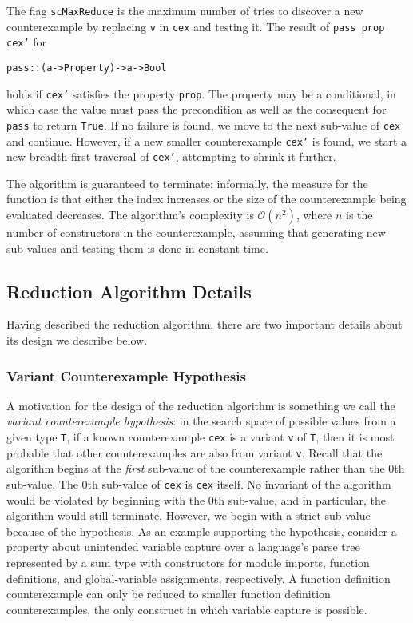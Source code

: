 \documentclass{sigplanconf}
\newenvironment{code}{\begin{alltt}}{\end{alltt}}
\newcommand{\ttp}[1]{\texttt{#1}}
\begin{document}
The flag \ttp{scMaxReduce} is the maximum number of tries to discover a new
counterexample by replacing \ttp{v} in \ttp{cex} and testing it.  The result of
\ttp{pass prop cex'} for
%
\begin{code}
pass :: (a -> Property) -> a -> Bool
\end{code}
%
\noindent
holds if \ttp{cex'} satisfies the property \ttp{prop}.  The property may be a
conditional, in which case the value must pass the precondition as well as the
consequent for \ttp{pass} to return \ttp{True}.  If no failure is found, we move
to the next sub-value of \ttp{cex} and continue.  However, if a new smaller
counterexample \ttp{cex'} is found, we start a new breadth-first traversal of
\ttp{cex'}, attempting to shrink it further.

The algorithm is guaranteed to terminate: informally, the measure for the
function is that either the index increases or the size of the counterexample
being evaluated decreases.  The algorithm's complexity is
$\mathcal{O}(n^2)$, where $n$ is the number of constructors in the
counterexample, assuming that generating new sub-values and testing them is done
in constant time.

\subsection{Reduction Algorithm Details}\label{sec:details}
Having described the reduction algorithm, there are two important details about
its design we describe below.

\subsubsection{Variant Counterexample Hypothesis}
A motivation for the design of the reduction algorithm is something we call the
\emph{variant counterexample hypothesis}: in the search space of possible values
from a given type \ttp{T}, if a known counterexample \ttp{cex} is a variant
\ttp{v} of \ttp{T}, then it is most probable that other counterexamples are also
from variant \ttp{v}.  Recall that the algorithm begins at the \emph{first}
sub-value of the counterexample rather than the 0th sub-value.  The 0th
sub-value of \ttp{cex} is \ttp{cex} itself.  No invariant of the algorithm would
be violated by beginning with the 0th sub-value, and in particular, the
algorithm would still terminate.  However, we begin with a strict sub-value
because of the hypothesis.  As an example supporting the hypothesis, consider a
property about unintended variable capture over a language's parse tree
represented by a sum type with constructors for module imports, function
definitions, and global-variable assignments, respectively.  A function
definition counterexample can only be reduced to smaller function definition
counterexamples, the only construct in which variable capture is possible.
\end{document}
